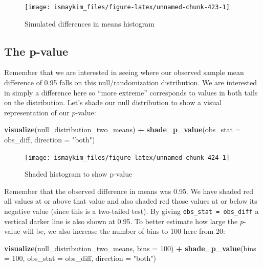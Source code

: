 \documentclass[12pt, krantz2,]{krantz}
\makeatletter
\newenvironment{Shaded}{\begin{snugshade}}{\end{snugshade}}
\newcommand{\DataTypeTok}[1]{\textcolor[rgb]{0.27,0.27,0.27}{#1}}
\newcommand{\DecValTok}[1]{\textcolor[rgb]{0.06,0.06,0.06}{#1}}
\newcommand{\KeywordTok}[1]{\textcolor[rgb]{0.27,0.27,0.27}{\textbf{#1}}}
\newcommand{\NormalTok}[1]{#1}
\newcommand{\OperatorTok}[1]{\textcolor[rgb]{0.43,0.43,0.43}{\textbf{#1}}}
\newcommand{\StringTok}[1]{\textcolor[rgb]{0.5,0.5,0.5}{#1}}
\newenvironment{kframe}{%
\medskip{}
\setlength{\fboxsep}{.8em}
 \def\at@end@of@kframe{}%
 \ifinner\ifhmode%
  \def\at@end@of@kframe{\end{minipage}}%
  \begin{minipage}{\columnwidth}%
 \fi\fi%
 \def\FrameCommand##1{\hskip\@totalleftmargin \hskip-\fboxsep
 \colorbox{shadecolor}{##1}\hskip-\fboxsep
     \hskip-\linewidth \hskip-\@totalleftmargin \hskip\columnwidth}%
 \MakeFramed {\advance\hsize-\width
   \@totalleftmargin\z@ \linewidth\hsize
   \@setminipage}}%
 {\par\unskip\endMakeFramed%
 \at@end@of@kframe}
\renewenvironment{Shaded}{\begin{kframe}}{\end{kframe}}
\makeatother
\begin{document}
\begin{figure}

{\centering \texttt{[image: ismaykim\_files/figure-latex/unnamed-chunk-423-1]} 

}

\caption{Simulated differences in means histogram}\label{fig:unnamed-chunk-423}
\end{figure}

\hypertarget{the-p-value}{%
\subsection{The p-value}\label{the-p-value}}

Remember that we are interested in seeing where our observed sample mean difference of 0.95 falls on this null/randomization distribution. We are interested in simply a difference here so ``more extreme'' corresponds to values in both tails on the distribution. Let's shade our null distribution to show a visual representation of our \(p\)-value:

\begin{Shaded}
\begin{Highlighting}[]
\KeywordTok{visualize}\NormalTok{(null_distribution_two_means) }\OperatorTok{+}\StringTok{ }
\StringTok{  }\KeywordTok{shade_p_value}\NormalTok{(}\DataTypeTok{obs_stat =}\NormalTok{ obs_diff, }\DataTypeTok{direction =} \StringTok{"both"}\NormalTok{)}
\end{Highlighting}
\end{Shaded}

\begin{figure}

{\centering \texttt{[image: ismaykim\_files/figure-latex/unnamed-chunk-424-1]} 

}

\caption{Shaded histogram to show p-value}\label{fig:unnamed-chunk-424}
\end{figure}

Remember that the observed difference in means was 0.95. We have shaded red all values at or above that value and also shaded red those values at or below its negative value (since this is a two-tailed test). By giving \texttt{obs\_stat\ =\ obs\_diff} a vertical darker line is also shown at 0.95. To better estimate how large the \(p\)-value will be, we also increase the number of bins to 100 here from 20:

\begin{Shaded}
\begin{Highlighting}[]
\KeywordTok{visualize}\NormalTok{(null_distribution_two_means, }\DataTypeTok{bins =} \DecValTok{100}\NormalTok{) }\OperatorTok{+}\StringTok{ }
\StringTok{  }\KeywordTok{shade_p_value}\NormalTok{(}\DataTypeTok{bins =} \DecValTok{100}\NormalTok{, }\DataTypeTok{obs_stat =}\NormalTok{ obs_diff, }\DataTypeTok{direction =} \StringTok{"both"}\NormalTok{)}
\end{Highlighting}
\end{Shaded}
\end{document}
